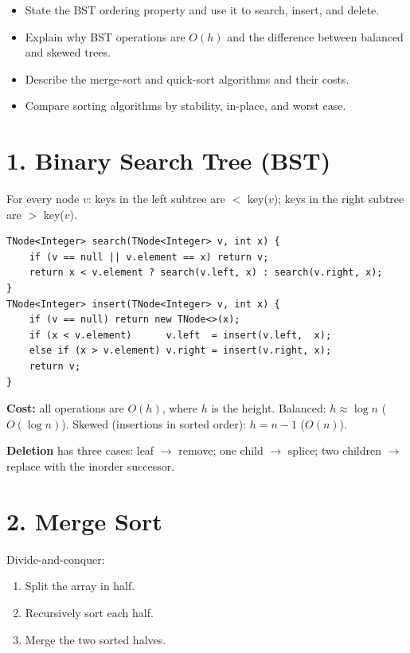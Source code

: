 \documentclass[11pt]{article}
\begin{document}

\begin{objbox}
\begin{itemize}[leftmargin=*]
  \item State the BST ordering property and use it to search, insert, and delete.
  \item Explain why BST operations are $O(h)$ and the difference between balanced and skewed trees.
  \item Describe the merge-sort and quick-sort algorithms and their costs.
  \item Compare sorting algorithms by stability, in-place, and worst case.
\end{itemize}
\end{objbox}

\section*{1. Binary Search Tree (BST)}

For every node $v$: keys in the left subtree are $<$ key($v$); keys in the right subtree are $>$ key($v$).

\begin{lstlisting}
TNode<Integer> search(TNode<Integer> v, int x) {
    if (v == null || v.element == x) return v;
    return x < v.element ? search(v.left, x) : search(v.right, x);
}
TNode<Integer> insert(TNode<Integer> v, int x) {
    if (v == null) return new TNode<>(x);
    if (x < v.element)      v.left  = insert(v.left,  x);
    else if (x > v.element) v.right = insert(v.right, x);
    return v;
}
\end{lstlisting}

\textbf{Cost:} all operations are $O(h)$, where $h$ is the height. Balanced: $h\approx \log n$ ($O(\log n)$). Skewed (insertions in sorted order): $h = n - 1$ ($O(n)$).

\textbf{Deletion} has three cases: leaf $\to$ remove; one child $\to$ splice; two children $\to$ replace with the inorder successor.

\section*{2. Merge Sort}

Divide-and-conquer:
\begin{enumerate}[leftmargin=*]
  \item Split the array in half.
  \item Recursively sort each half.
  \item Merge the two sorted halves.
\end{enumerate}
\end{document}
